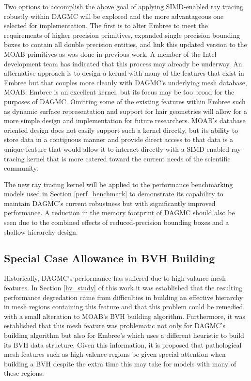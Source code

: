 \documentclass[12pt, a4paper]{article}
\begin{document}
Two options to accomplish the above goal of applying SIMD-enabled ray tracing robustly within DAGMC will be explored and the more advantageous one selected for implementation. The first is to alter Embree to meet the requirements of higher precision primitives, expanded single precision bounding boxes to contain all double precision entities, and link this updated version to the MOAB primitives as was done in previous work. A member of the Intel development team has indicated that this process may already be underway. An alternative approach is to design a kernal with many of the features that exist in Embree but that couples more cleanly with DAGMC's underlying mesh database, MOAB. Embree is an excellent kernel, but its focus may be too broad for the purposes of DAGMC. Omitting some of the existing features within Embree such as dynamic surface representation and support for hair geometries \cite{Woop_2014} will allow for a more simple design and implementation for future researchers. MOAB's database oriented design does not easily support such a kernel directly, but its ability to store data in a contiguous manner and provide direct access to that data is a unique feature that would allow it to interact directly with a SIMD-enabled ray tracing kernel that is more catered toward the current needs of the scientific community.

The new ray tracing kernel will be applied to the performance benchmarking models used in Section \ref{perf_benchmark} to demonstrate its capability to maintain DAGMC's current robustness but with significantly improved performance. A reduction in the memory footprint of DAGMC should also be seen due to the combined effects of reduced-precision bounding boxes and a shallow hierarchy design.

\subsection{Special Case Allowance in BVH Building}

Historically, DAGMC's performance has suffered due to high-valance mesh features. In Section \ref{hv_study} of this work it was established that the resulting performance degredation came from difficulties in building an effective hierarchy in mesh regions containing this feature and that this problem could be remedied with a small alteration to MOAB's BVH building algorithm. Furthermore, it was established that this mesh feature was problematic not only for DAGMC's building algorithm but also for Embree's which uses a different heuristic to build its BVH data structure. Given this information, it is proposed that pathological mesh features such as high-valence regions be given special attention when building a BVH despite the extra time this may take for models with many of these regions.
\end{document}
